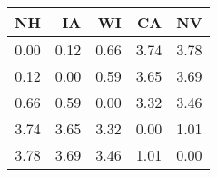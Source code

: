 \begin{tabular}{rrrrr}
\midrule  NH & IA & WI & CA & NV \\  \midrule
 0.00 & 0.12 & 0.66 & 3.74 & 3.78 \\ 
  0.12 & 0.00 & 0.59 & 3.65 & 3.69 \\ 
  0.66 & 0.59 & 0.00 & 3.32 & 3.46 \\ 
  3.74 & 3.65 & 3.32 & 0.00 & 1.01 \\ 
  3.78 & 3.69 & 3.46 & 1.01 & 0.00 \\ 
  \end{tabular} 
